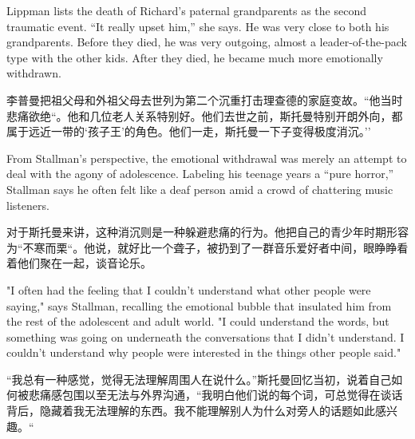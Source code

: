\ifdefined\eng
Lippman lists the death of Richard's paternal grandparents as the second traumatic event. ``It really upset him,'' she says. He was very close to both his grandparents. Before they died, he was very outgoing, almost a leader-of-the-pack type with the other kids. After they died, he became much more emotionally withdrawn.
\fi

\ifdefined\chs
李普曼把祖父母和外祖父母去世列为第二个沉重打击理查德的家庭变故。``他当时悲痛欲绝``。他和几位老人关系特别好。他们去世之前，斯托曼特别开朗外向，都属于远近一带的`孩子王'的角色。他们一走，斯托曼一下子变得极度消沉。''
\fi

\ifdefined\eng
From Stallman's perspective, the emotional withdrawal was merely an attempt to deal with the agony of adolescence. Labeling his teenage years a ``pure horror,'' Stallman says he often felt like a deaf person amid a crowd of chattering music listeners.
\fi

\ifdefined\chs
对于斯托曼来讲，这种消沉则是一种躲避悲痛的行为。他把自己的青少年时期形容为``不寒而栗``。他说，就好比一个聋子，被扔到了一群音乐爱好者中间，眼睁睁看着他们聚在一起，谈音论乐。
\fi

\ifdefined\eng
"I often had the feeling that I couldn't understand what other people were saying," says Stallman, recalling the emotional bubble that insulated him from the rest of the adolescent and adult world. "I could understand the words, but something was going on underneath the conversations that I didn't understand. I couldn't understand why people were interested in the things other people said."

\fi

\ifdefined\chs
``我总有一种感觉，觉得无法理解周围人在说什么。''斯托曼回忆当初，说着自己如何被悲痛感包围以至无法与外界沟通，``我明白他们说的每个词，可总觉得在谈话背后，隐藏着我无法理解的东西。我不能理解别人为什么对旁人的话题如此感兴趣。``
\fi

